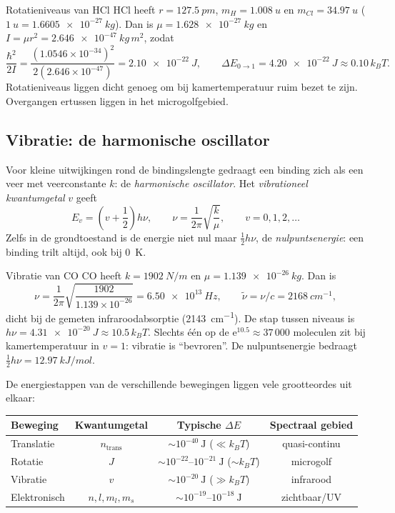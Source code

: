 \begin{voorbeeld}{Rotatieniveaus van HCl}
HCl heeft $r=\SI{127.5}{pm}$, $m_H=\SI{1.008}{u}$ en $m_{Cl}=\SI{34.97}{u}$ ($\SI{1}{u}=\SI{1.6605e-27}{kg}$). Dan is $\mu = \SI{1.628e-27}{kg}$ en $I = \mu r^2 = \SI{2.646e-47}{kg\,m^2}$, zodat
\[
\frac{\hbar^2}{2I} = \frac{(1.0546\times10^{-34})^2}{2(2.646\times10^{-47})} = \SI{2.10e-22}{J}, \qquad \Delta E_{0\to1} = \SI{4.20e-22}{J} \approx 0.10\,k_BT.
\]
Rotatieniveaus liggen dicht genoeg om bij kamertemperatuur ruim bezet te zijn. Overgangen ertussen liggen in het microgolfgebied.
\end{voorbeeld}

\subsection{Vibratie: de harmonische oscillator}
\label{sec:vibratie}

Voor kleine uitwijkingen rond de bindingslengte gedraagt een binding zich als een veer met veerconstante $k$: de \emph{harmonische oscillator}. Het \emph{vibrationeel kwantumgetal} $v$ geeft
\begin{equation}
\boxed{
E_v = \left(v+\frac{1}{2}\right)h\nu, \qquad \nu = \frac{1}{2\pi}\sqrt{\frac{k}{\mu}}, \qquad v=0,1,2,\ldots
}
\end{equation}
Zelfs in de grondtoestand is de energie niet nul maar $\tfrac{1}{2}h\nu$, de \emph{nulpuntsenergie}: een binding trilt altijd, ook bij \SI{0}{K}.

\begin{voorbeeld}{Vibratie van CO}
CO heeft $k=\SI{1902}{N/m}$ en $\mu = \SI{1.139e-26}{kg}$. Dan is
\[
\nu = \frac{1}{2\pi}\sqrt{\frac{1902}{1.139\times10^{-26}}} = \SI{6.50e13}{Hz}, \qquad \tilde\nu = \nu/c = \SI{2168}{cm^{-1}},
\]
dicht bij de gemeten infraroodabsorptie (\SI{2143}{cm^{-1}}). De stap tussen niveaus is $h\nu = \SI{4.31e-20}{J} \approx 10.5\,k_BT$. Slechts één op de $\mathrm{e}^{10.5} \approx 37\,000$ moleculen zit bij kamertemperatuur in $v=1$: vibratie is ``bevroren''. De nulpuntsenergie bedraagt $\tfrac{1}{2}h\nu = \SI{12.97}{kJ/mol}$.
\end{voorbeeld}

De energiestappen van de verschillende bewegingen liggen vele grootteordes uit elkaar:

\begin{center}
\begin{tabular}{lccc}
\toprule
Beweging & Kwantumgetal & Typische $\Delta E$ & Spectraal gebied \\
\midrule
Translatie & $n_{\mathrm{trans}}$ & $\sim 10^{-40}~\mathrm{J}$ ($\ll k_BT$) & quasi-continu \\
Rotatie & $J$ & $\sim 10^{-22}$--$10^{-21}~\mathrm{J}$ ($\sim k_BT$) & microgolf \\
Vibratie & $v$ & $\sim 10^{-20}~\mathrm{J}$ ($\gg k_BT$) & infrarood \\
Elektronisch & $n,l,m_l,m_s$ & $\sim 10^{-19}$--$10^{-18}~\mathrm{J}$ & zichtbaar/UV \\
\bottomrule
\end{tabular}
\end{center}

